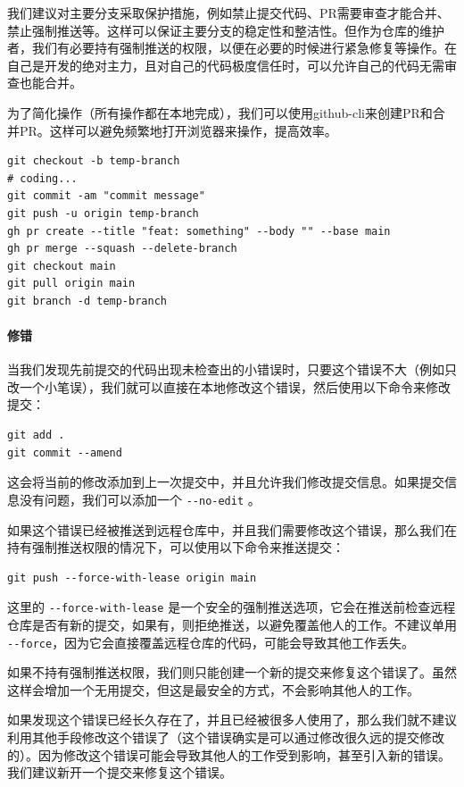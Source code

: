 我们建议对主要分支采取保护措施，例如禁止提交代码、PR需要审查才能合并、禁止强制推送等。这样可以保证主要分支的稳定性和整洁性。但作为仓库的维护者，我们有必要持有强制推送的权限，以便在必要的时候进行紧急修复等操作。在自己是开发的绝对主力，且对自己的代码极度信任时，可以允许自己的代码无需审查也能合并。

为了简化操作（所有操作都在本地完成），我们可以使用github-cli来创建PR和合并PR。这样可以避免频繁地打开浏览器来操作，提高效率。
\begin{verbatim}
git checkout -b temp-branch
# coding...
git commit -am "commit message"
git push -u origin temp-branch
gh pr create --title "feat: something" --body "" --base main
gh pr merge --squash --delete-branch
git checkout main
git pull origin main
git branch -d temp-branch
\end{verbatim}

\paragraph{修错}

当我们发现先前提交的代码出现未检查出的小错误时，只要这个错误不大（例如只改一个小笔误），我们就可以直接在本地修改这个错误，然后使用以下命令来修改提交：
\begin{verbatim}
git add .
git commit --amend
\end{verbatim}
这会将当前的修改添加到上一次提交中，并且允许我们修改提交信息。如果提交信息没有问题，我们可以添加一个 \verb|--no-edit| 。

如果这个错误已经被推送到远程仓库中，并且我们需要修改这个错误，那么我们在持有强制推送权限的情况下，可以使用以下命令来推送提交：
\begin{verbatim}
git push --force-with-lease origin main
\end{verbatim}
这里的 \verb|--force-with-lease| 是一个安全的强制推送选项，它会在推送前检查远程仓库是否有新的提交，如果有，则拒绝推送，以避免覆盖他人的工作。不建议单用 \verb|--force|，因为它会直接覆盖远程仓库的代码，可能会导致其他工作丢失。

如果不持有强制推送权限，我们则只能创建一个新的提交来修复这个错误了。虽然这样会增加一个无用提交，但这是最安全的方式，不会影响其他人的工作。

如果发现这个错误已经长久存在了，并且已经被很多人使用了，那么我们就不建议利用其他手段修改这个错误了（这个错误确实是可以通过修改很久远的提交修改的）。因为修改这个错误可能会导致其他人的工作受到影响，甚至引入新的错误。我们建议新开一个提交来修复这个错误。

